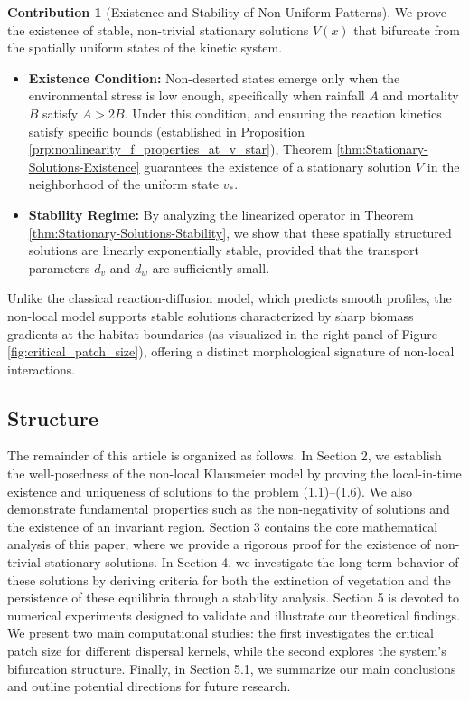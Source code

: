 \documentclass[preprint,12pt]{elsarticle}
\theoremstyle{plain}
\theoremstyle{definition}
\newtheorem{main_contrib}{Contribution}
\theoremstyle{remark}
\begin{document}
\begin{main_contrib}[Existence and Stability of Non-Uniform Patterns]
We prove the existence of stable, non-trivial stationary solutions $V(x)$ that bifurcate from the spatially uniform states of the kinetic system.
\begin{itemize}
    \item \textbf{Existence Condition:} Non-deserted states emerge only when the environmental stress is low enough, specifically when rainfall $A$ and mortality $B$ satisfy $A > 2B$. Under this condition, and ensuring the reaction kinetics satisfy specific bounds (established in Proposition \ref{prp:nonlinearity_f_properties_at_v_star}), Theorem \ref{thm:Stationary-Solutions-Existence} guarantees the existence of a stationary solution $V$ in the neighborhood of the uniform state $v_*$.
    \item \textbf{Stability Regime:} By analyzing the linearized operator in Theorem \ref{thm:Stationary-Solutions-Stability}, we show that these spatially structured solutions are linearly exponentially stable, provided that the transport parameters $d_v$ and $d_w$ are sufficiently small.
\end{itemize}
Unlike the classical reaction-diffusion model, which predicts smooth profiles, the non-local model supports stable solutions characterized by sharp biomass gradients at the habitat boundaries (as visualized in the right panel of Figure \ref{fig:critical_patch_size}), offering a distinct morphological signature of non-local interactions.
\end{main_contrib}


\subsection{Structure}
The remainder of this article is organized as follows. 
In Section 2, we establish the well-posedness of the non-local Klausmeier model by proving the local-in-time existence and uniqueness of solutions to the problem (1.1)--(1.6). We also demonstrate fundamental properties such as the non-negativity of solutions and the existence of an invariant region. 
Section 3 contains the core mathematical analysis of this paper, where we provide a rigorous proof for the existence of non-trivial stationary solutions. 
In Section 4, we investigate the long-term behavior of these solutions by deriving criteria for both the extinction of vegetation and the persistence of these equilibria through a stability analysis. 
Section 5 is devoted to numerical experiments designed to validate and illustrate our theoretical findings. We present two main computational studies: the first investigates the critical patch size for different dispersal kernels, while the second explores the system's bifurcation structure. 
Finally, in Section 5.1, we summarize our main conclusions and outline potential directions for future research.
\end{document}
